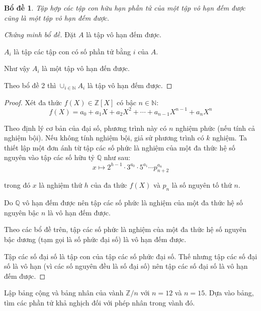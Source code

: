 \documentclass[class=linearalgebra,crop=false]{standalone}
\newtheorem{lemma}{Bổ đề}
\begin{document}
\begin{lemma}Tập hợp các tập con hữu hạn phần tử của một tập vô hạn đếm được cũng là một tập vô hạn đếm được.
\end{lemma}

\begin{proof}[Chứng minh bổ đề]Đặt $A$ là tập vô hạn đếm được.
    \par $A_{i}$ là tập các tập con có số phần tử bằng $i$ của $A$.
    \par Như vậy $A_{i}$ là một tập vô hạn đến được.
    \par Theo bổ đề 2 thì $\cup_{i\in\mathbb{N}}A_{i}$ là tập vô hạn đếm được.
\end{proof}

\begin{proof}Xét đa thức $f(X) \in \mathbb{Z}[X]$ có bậc $n \in \mathbb{N}$:
    \[ f(X) = a_{0} + a_{1}X + a_{2}X^{2} + \cdots + a_{n-1}X^{n-1} + a_{n}X^{n} \]
    \par Theo định lý cơ bản của đại số, phương trình này có $n$ nghiệm phức (nếu tính cả nghiệm bội). Nếu không tính nghiệm bội, giả sử phương trình có $k$ nghiệm. Ta thiết lập một đơn ánh từ tập các số phức là nghiệm của một đa thức hệ số nguyên vào tập các số hữu tỷ $\mathbb{Q}$ như sau:
    \[ x\longmapsto 2^{h - 1}\cdot 3^{a_{0}}\cdot 5^{a_{1}}\cdots p_{n+2}^{a_{n}} \]
    \par trong đó $x$ là nghiệm thứ $h$ của đa thức $f(X)$ và $p_{n}$ là số nguyên tố thứ $n$.
    \par Do $\mathbb{Q}$ vô hạn đếm được nên tập các số phức là nghiệm của một đa thức hệ số nguyên bậc $n$ là vô hạn đếm được.
    \par Theo các bổ đề trên, tập các số phức là nghiệm của một đa thức hệ số nguyên bậc dương (tạm gọi là số phức đại số) là vô hạn đếm được.
    \par Tập các số đại số là tập con của tập các số phức đại số. Thế nhưng tập các số đại số là vô hạn (vì các số nguyên đều là số đại số) nên tập các số đại số là vô hạn đếm được.
\end{proof}

\begin{exercise}Lập bảng cộng và bảng nhân của vành $\mathbb{Z}/n$ với $n = 12$ và $n = 15$. Dựa vào bảng, tìm các phần tử khả nghịch đối với phép nhân trong vành đó.
\end{exercise}
\end{document}

